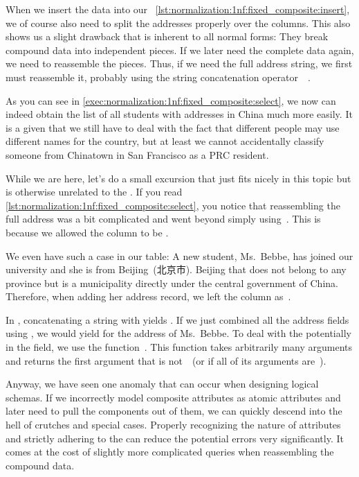 When we insert the data into our \db\ \cref{lst:normalization:1nf:fixed_composite:insert}, we of course also need to split the addresses properly over the columns.
This also shows us a slight drawback that is inherent to all normal forms:
They break compound data into independent pieces.
If we later need the complete data again, we need to reassemble the pieces.
Thus, if we need the full address string, we first must reassemble it, probably using the string concatenation operator~\sqlil{||}\sqlIdx{\textbar\textbar}~\cite{PGDG:PD:SFAO}.

As you can see in \cref{exec:normalization:1nf:fixed_composite:select}, we now can indeed obtain the list of all students with addresses in China much more easily.
It is a given that we still have to deal with the fact that different people may use different names for the country, but at least we cannot accidentally classify someone from Chinatown in San Francisco as a PRC resident.

While we are here, let's do a small excursion that just fits nicely in this topic but is otherwise unrelated to the .
If you read \cref{lst:normalization:1nf:fixed_composite:select}, you notice that reassembling the full address was a bit complicated and went beyond simply using~\sqlil{||}\sqlIdx{\textbar\textbar}.
This is because we allowed the  column to be .

We even have such a case in our table:
A new student, Ms.~Bebbe, has joined our university and she is from Beijing~(北京市).
Beijing that does not belong to any province but is a municipality directly under the central government of China.
Therefore, when adding her address record, we left the  column as~.

In \postgresql, concatenating a string with  yields .
If we just combined all the address fields using \sqlil{||}\sqlIdx{\textbar\textbar}, we would yield  for the address of Ms.~Bebbe.
To deal with the potentially  in the  field, we use the  function~\cite{PGDG:PD:CE}.
This function takes arbitrarily many arguments and returns the first argument that is not~~(or  if all of its arguments are~).

Anyway, we have seen one anomaly that can occur when designing logical schemas.
If we incorrectly model composite attributes as atomic attributes and later need to pull the components out of them, we can quickly descend into the hell of crutches and special cases.
Properly recognizing the nature of attributes and strictly adhering to the  can reduce the potential errors very significantly.
It comes at the cost of slightly more complicated queries when reassembling the compound data.%
%
\FloatBarrier%
\endhsection%
%

